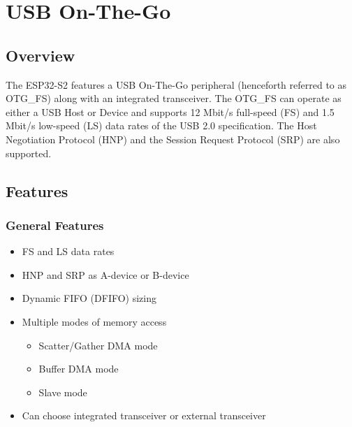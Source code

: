 \documentclass[main\_\_EN.tex]{subfiles}
\begin{document}
\setenglishformatting

\ifglobal
\else
    {\let\clearpage\relax \listoftodos}
    \tableofcontents
\fi



\hypertarget{usbotg}{}
\chapter{USB On-The-Go}
\label{mod:usbotg}


\section{Overview}
The ESP32-S2 features a USB On-The-Go peripheral (henceforth referred to as OTG\_FS) along with an integrated transceiver. The OTG\_FS can operate as either a USB Host or Device and supports 12 Mbit/s full-speed (FS) and 1.5 Mbit/s low-speed (LS) data rates of the USB 2.0 specification. The Host Negotiation Protocol (HNP) and the Session Request Protocol (SRP) are also supported.

\section{Features}

\subsection{General Features}
\begin{itemize}
    \item FS and LS data rates
    \item HNP and SRP as A-device or B-device
    \item Dynamic FIFO (DFIFO) sizing
    \item Multiple modes of memory access
    \begin{itemize}
        \item Scatter/Gather DMA mode
        \item Buffer DMA mode
        \item Slave mode
    \end{itemize}
    \item Can choose integrated transceiver or external transceiver
\end{itemize}
\end{document}
